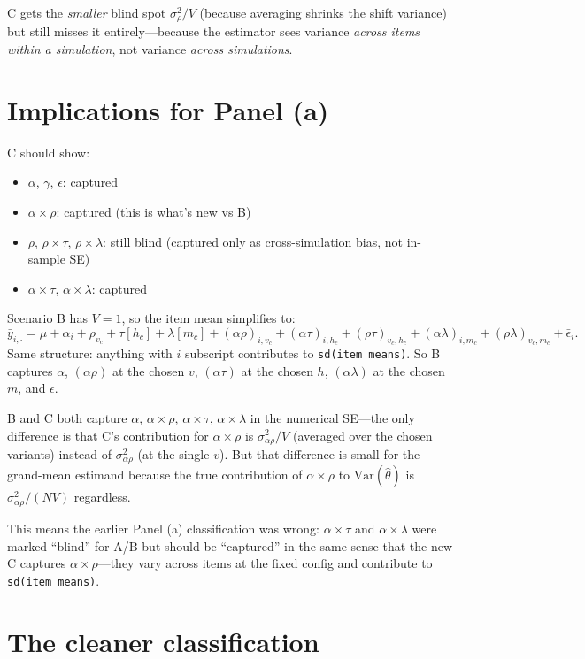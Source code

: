 \documentclass[11pt]{article}
\begin{document}
C gets the \emph{smaller} blind spot $\sigma^2_\rho / V$ (because averaging shrinks the shift variance) but still misses it entirely---because the estimator sees variance \emph{across items within a simulation}, not variance \emph{across simulations}.

\section*{Implications for Panel (a)}

C should show:
\begin{itemize}
  \item $\alpha$, $\gamma$, $\epsilon$: captured
  \item $\alpha \times \rho$: captured (this is what's new vs B)
  \item $\rho$, $\rho \times \tau$, $\rho \times \lambda$: still blind (captured only as cross-simulation bias, not in-sample SE)
  \item $\alpha \times \tau$, $\alpha \times \lambda$: captured
\end{itemize}

Scenario B has $V=1$, so the item mean simplifies to:
\[
\bar{y}_{i,\cdot} = \mu + \alpha_i + \rho_{v_c} + \tau[h_c] + \lambda[m_c] + (\alpha\rho)_{i,v_c} + (\alpha\tau)_{i,h_c} + (\rho\tau)_{v_c,h_c} + (\alpha\lambda)_{i,m_c} + (\rho\lambda)_{v_c,m_c} + \bar\epsilon_i.
\]
Same structure: anything with $i$ subscript contributes to \texttt{sd(item means)}. So B captures $\alpha$, $(\alpha\rho)$ at the chosen $v$, $(\alpha\tau)$ at the chosen $h$, $(\alpha\lambda)$ at the chosen $m$, and $\epsilon$.

B and C both capture $\alpha$, $\alpha\times\rho$, $\alpha\times\tau$, $\alpha\times\lambda$ in the numerical SE---the only difference is that C's contribution for $\alpha\times\rho$ is $\sigma^2_{\alpha\rho}/V$ (averaged over the chosen variants) instead of $\sigma^2_{\alpha\rho}$ (at the single $v$). But that difference is small for the grand-mean estimand because the true contribution of $\alpha\times\rho$ to $\mathrm{Var}(\hat\theta)$ is $\sigma^2_{\alpha\rho}/(NV)$ regardless.

This means the earlier Panel (a) classification was wrong: $\alpha\times\tau$ and $\alpha\times\lambda$ were marked ``blind'' for A/B but should be ``captured'' in the same sense that the new C captures $\alpha\times\rho$---they vary across items at the fixed config and contribute to \texttt{sd(item means)}.

\section*{The cleaner classification}
\end{document}
